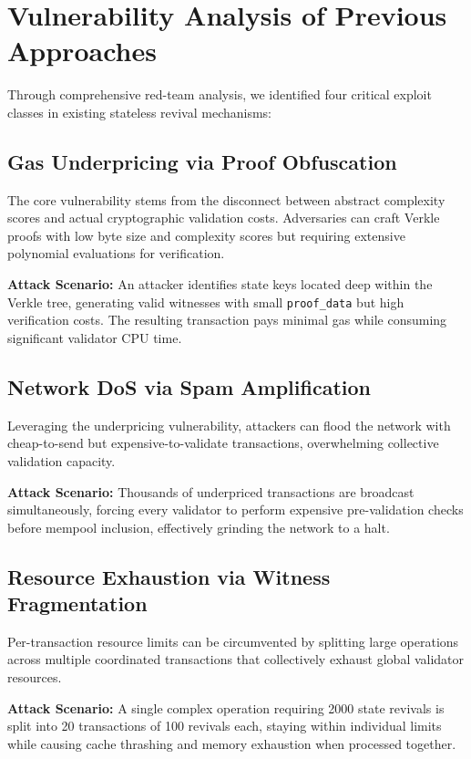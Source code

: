 \documentclass{article}
\begin{document}
\section{Vulnerability Analysis of Previous Approaches}

Through comprehensive red-team analysis, we identified four critical exploit classes in existing stateless revival mechanisms:

\subsection{Gas Underpricing via Proof Obfuscation}

The core vulnerability stems from the disconnect between abstract complexity scores and actual cryptographic validation costs. Adversaries can craft Verkle proofs with low byte size and complexity scores but requiring extensive polynomial evaluations for verification.

\textbf{Attack Scenario:} An attacker identifies state keys located deep within the Verkle tree, generating valid witnesses with small \texttt{proof\_data} but high verification costs. The resulting transaction pays minimal gas while consuming significant validator CPU time.

\subsection{Network DoS via Spam Amplification}

Leveraging the underpricing vulnerability, attackers can flood the network with cheap-to-send but expensive-to-validate transactions, overwhelming collective validation capacity.

\textbf{Attack Scenario:} Thousands of underpriced transactions are broadcast simultaneously, forcing every validator to perform expensive pre-validation checks before mempool inclusion, effectively grinding the network to a halt.

\subsection{Resource Exhaustion via Witness Fragmentation}

Per-transaction resource limits can be circumvented by splitting large operations across multiple coordinated transactions that collectively exhaust global validator resources.

\textbf{Attack Scenario:} A single complex operation requiring 2000 state revivals is split into 20 transactions of 100 revivals each, staying within individual limits while causing cache thrashing and memory exhaustion when processed together.
\end{document}
